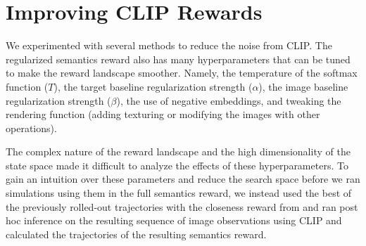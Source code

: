 







\section{Improving CLIP Rewards}
\label{sec:improving-rewards}

We experimented with several methods to reduce the noise from CLIP.
The regularized semantics reward also has many hyperparameters that can be tuned to make the reward landscape smoother.
Namely, the temperature of the softmax function (\(T\)), the target baseline regularization strength (\(\alpha\)), the image baseline regularization strength (\(\beta\)), the use of negative embeddings, and tweaking the rendering function (adding texturing or modifying the images with other operations).

The complex nature of the reward landscape and the high dimensionality of the state space made it difficult to analyze the effects of these hyperparameters.
To gain an intuition over these parameters and reduce the search space before we ran simulations using them in the full semantics reward, we instead used the best of the previously rolled-out trajectories with the closeness reward from  and ran post hoc inference on the resulting sequence of image observations using CLIP and calculated the trajectories of the resulting semantics reward.

